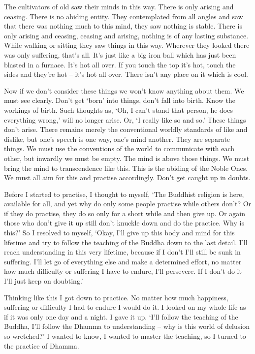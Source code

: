 The cultivators of old saw their minds in this way. There is only arising and ceasing. There is no abiding entity. They contemplated from all angles and saw that there was nothing much to this mind, they saw nothing is stable. There is only arising and ceasing, ceasing and arising, nothing is of any lasting substance. While walking or sitting they saw things in this way. Wherever they looked there was only suffering, that's all. It's just like a big iron ball which has just been blasted in a furnace. It's hot all over. If you touch the top it's hot, touch the sides and they're hot -- it's hot all over. There isn't any place on it which is cool. 

Now if we don't consider these things we won't know anything about them. We must see clearly. Don't get `born' into things, don't fall into birth. Know the workings of birth. Such thoughts as, `Oh, I can't stand that person, he does everything wrong,' will no longer arise. Or, `I really like so and so.' These things don't arise. There remains merely the conventional worldly standards of like and dislike, but one's speech is one way, one's mind another. They are separate things. We must use the conventions of the world to communicate with each other, but inwardly we must be empty. The mind is above those things. We must bring the mind to transcendence like this. This is the abiding of the Noble Ones. We must all aim for this and practise accordingly. Don't get caught up in doubts. 

Before I started to practise, I thought to myself, `The Buddhist religion is here, available for all, and yet why do only some people practise while others don't? Or if they do practise, they do so only for a short while and then give up. Or again those who don't give it up still don't knuckle down and do the practice. Why is this?' So I resolved to myself, `Okay, I'll give up this body and mind for this lifetime and try to follow the teaching of the Buddha down to the last detail. I'll reach understanding in this very lifetime, because if I don't I'll still be sunk in suffering. I'll let go of everything else and make a determined effort, no matter how much difficulty or suffering I have to endure, I'll persevere. If I don't do it I'll just keep on doubting.' 

Thinking like this I got down to practice. No matter how much happiness, suffering or difficulty I had to endure I would do it. I looked on my whole life as if it was only one day and a night. I gave it up. `I'll follow the teaching of the Buddha, I'll follow the Dhamma to understanding -- why is this world of delusion so wretched?' I wanted to know, I wanted to master the teaching, so I turned to the practice of Dhamma. 

